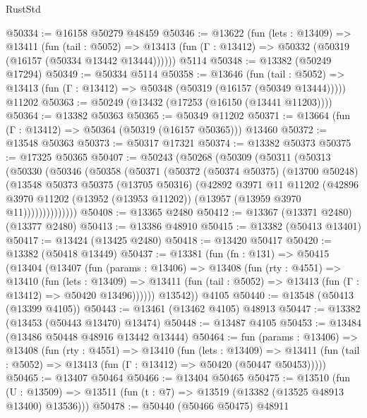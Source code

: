 \begin{lexlean}{RustStd}
\begin{coremodule}
@50334 := @16158 @50279 @48459
@50346 := @13622
    (fun (lets : @13409) =>
    @13411
      (fun (tail : @5052) =>
      @13413 (fun (Γ : @13412) => @50332 (@50319 (@16157 (@50334 @13442 @13444))))))
    @5114
@50348 := @13382 (@50249 @17294)
@50349 := @50334 @5114
@50358 := @13646
    (fun (tail : @5052) => @13413 (fun (Γ : @13412) => @50348 (@50319 (@16157 (@50349 @13444)))))
    @11202
@50363 := @50249 (@13432 (@17253 (@16150 (@13441 @11203))))
@50364 := @13382 @50363
@50365 := @50349 @11202
@50371 := @13664 (fun (Γ : @13412) => @50364 (@50319 (@16157 @50365))) @13460
@50372 := @13548 @50363
@50373 := @50317 @17321
@50374 := @13382 @50373
@50375 := @17325 @50365
@50407 := @50243
    (@50268
      (@50309
        (@50311
          (@50313
            (@50330
              (@50346
                (@50358
                  (@50371
                    (@50372
                      (@50374 @50375)
                      (@13700 @50248)
                      (@13548
                        @50373
                        @50375
                        (@13705 @50316)
                        (@42892
                          @3971
                          @11
                          @11202
                          (@42896
                            @3970
                            @11202
                            (@13952 (@13953 @11202))
                            (@13957 (@13959 @3970 @11))))))))))))))
@50408 := @13365 @2480
@50412 := @13367 (@13371 @2480) (@13377 @2480)
@50413 := @13386 @48910
@50415 := @13382 (@50413 @13401)
@50417 := @13424 (@13425 @2480)
@50418 := @13420 @50417
@50420 := @13382 (@50418 @13449)
@50437 := @13381
    (fun (fn : @131) =>
    @50415
      (@13404
        (@13407
          (fun (params : @13406) =>
          @13408
            (fun (rty : @4551) =>
            @13410
              (fun (lets : @13409) =>
              @13411 (fun (tail : @5052) => @13413 (fun (Γ : @13412) => @50420 @13496))))))
        @13542))
    @4105
@50440 := @13548 (@50413 (@13399 @4105))
@50443 := @13461 (@13462 @4105) @48913
@50447 := @13382 (@13453 (@50443 @13470) @13474)
@50448 := @13487 @4105
@50453 := @13484 (@13486 @50448 @48916 @13442 @13444)
@50464 := fun (params : @13406) =>
  @13408
    (fun (rty : @4551) =>
    @13410
      (fun (lets : @13409) =>
      @13411 (fun (tail : @5052) => @13413 (fun (Γ : @13412) => @50420 (@50447 @50453)))))
@50465 := @13407 @50464
@50466 := @13404 @50465
@50475 := @13510
    (fun (U : @13509) => @13511 (fun (t : @7) => @13519 (@13382 (@13525 @48913 @13400) @13536)))
@50478 := @50440 (@50466 @50475) @48911

\end{coremodule}
\end{lexlean}
